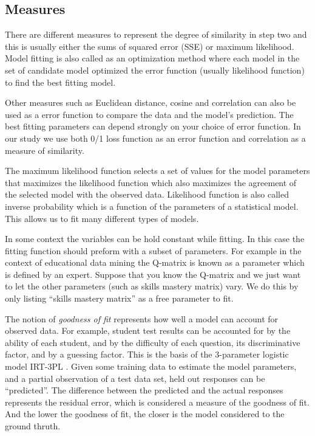 \subsection{Measures}
There are different measures to represent the degree of similarity in step two and this is usually either the sums of squared error (SSE) or maximum likelihood. Model fitting is also called as an optimization method where each model in the set of candidate model optimized the error function (usually likelihood function) to find the best fitting model.

Other measures such as Euclidean distance, cosine and correlation can also be used as a error function to compare the data and the model's prediction. The best fitting parameters can depend strongly on your choice of error function. In our study we use both 0/1 loss function as an error function and correlation as a measure of similarity.

The maximum likelihood function selects a set of values for the model parameters that maximizes the likelihood function which also maximizes the agreement of the selected model with the observed data. Likelihood function is also called inverse probability which is a function of the parameters of a statistical model. This allows us to fit many different types of models.

In some context the variables can be hold constant while fitting. In this case the fitting function should preform with a subset of parameters. For example in the context of educational data mining the Q-matrix is known as a parameter which is defined by an expert. Suppose that you know the Q-matrix and we just want to let the other parameters (such as skills mastery matrix) vary. We do this by only listing ``skills mastery matrix'' as a free parameter to fit.

The notion of \textit{goodness of fit} represents how well a model can account for observed data.  For example, student test results can be accounted for by the ability of each student, and by the difficulty of each question, its discriminative factor, and by a guessing factor.  This is the basis of the 3-parameter logistic model IRT-3PL \cite{bakerKim2004}.  Given some training data to estimate the model parameters, and a partial observation of a test data set, held out responses can be ``predicted''.  The difference between the predicted and the actual responses represents the residual error, which is considered a measure of the goodness of fit.  And the lower the goodness of fit, the closer is the model considered to the ground thruth.

